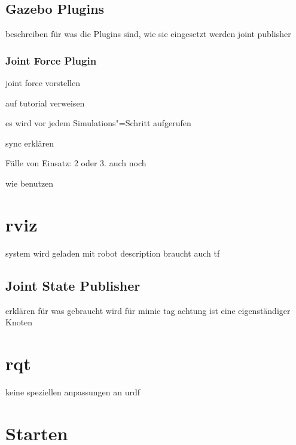 \subsection{Gazebo Plugins}
beschreiben für was die Plugins sind, wie sie eingesetzt werden
joint publisher


\subsubsection{Joint Force Plugin}
joint force vorstellen

auf tutorial verweisen

es wird vor jedem Simulations"=Schritt aufgerufen

sync erklären

Fälle von Einsatz: 2 oder 3. auch noch

wie benutzen 


\section{rviz}
system wird geladen mit robot description
braucht auch tf

\subsection{Joint State Publisher}
erklären für was gebraucht wird
für mimic tag
achtung ist eine eigenständiger Knoten


\section{rqt}
keine speziellen anpassungen an urdf 

\section{Starten}

